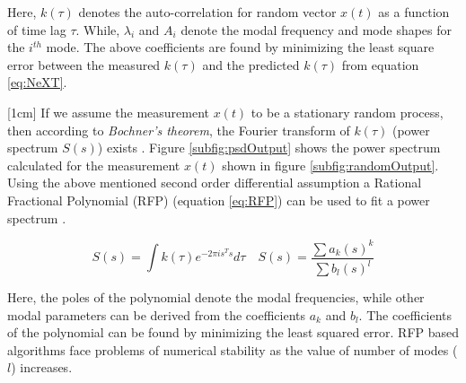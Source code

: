 Here, $k(\tau)$ denotes the auto-correlation for random vector $x(t)$ as a function of time lag $\tau$. While, $\lambda_{i}$ and $A_{i}$ denote the modal frequency and mode shapes for the $i^{th}$ mode. The above coefficients are found by minimizing the least square error between the measured $k(\tau)$ and the predicted $k(\tau)$ from equation \ref{eq:NeXT}.

[1cm]
If we assume the measurement $x(t)$ to be a stationary random process, then according to \textit{Bochner's theorem}, the Fourier transform of $k(\tau)$ (power spectrum $S(s)$) exists \cite{bochner2016lectures}. Figure \ref{subfig:psdOutput} shows the power spectrum calculated for the measurement $x(t)$ shown in figure \ref{subfig:randomOutput}. Using the above mentioned second order differential assumption a Rational Fractional Polynomial (RFP) (equation \ref{eq:RFP}) can be used to fit a power spectrum \cite{richardson1982parameter, allemang1998unified, chauhan2007unified}.

\begin{equation}\label{eq:RFP}
S(s) = \int k(\tau) e^{-2 \pi is^{T} s}d\tau \quad    S(s) = \frac{\sum a_{k}(s)^{k}}{\sum b_{l}(s)^{l}}
\end{equation}

Here, the poles of the polynomial denote the modal frequencies, while other modal parameters can be derived from the coefficients $a_{k}$ and $b_{l}$. The coefficients of the polynomial can be found by minimizing the least squared error. RFP based algorithms face problems of numerical stability as the value of number of modes ($l$) increases.

